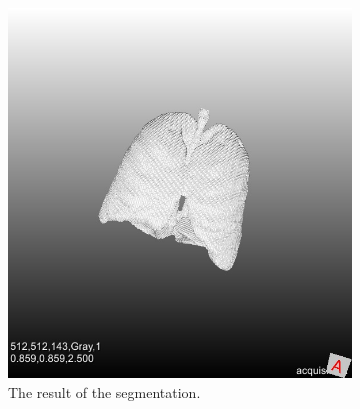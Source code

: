 \documentclass[a4paper,10pt]{article}
\numberwithin{equation}{section} %
\numberwithin{figure}{section} %
\numberwithin{table}{section} %
\begin{document}
\begin{figure}[h]
\begin{subfigure}[b]{0.45\textwidth}
        \includegraphics[width=\textwidth]{lungs_without_meuk}
        \caption{The result of the segmentation.}
        \label{fig:lungs}
    \end{subfigure}
    \caption{}\label{fig:lung-segmentation}
\end{figure}



\end{document}

